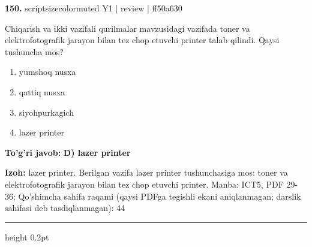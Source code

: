 \documentclass[10pt,a4paper]{article}
\begin{document}
{\bfseries\sffamily\color{ink} 150.} {scriptsizecolor{muted} Y1 | review | ff50a630}
\par
Chiqarish va ikki vazifali qurilmalar mavzusidagi vazifada toner va elektrofotografik jarayon bilan tez chop etuvchi printer talab qilindi. Qaysi tushuncha mos?
\begin{enumerate}[label=\Alph*),leftmargin=9mm]
\item yumshoq nusxa
\item qattiq nusxa
\item siyohpurkagich
\item lazer printer
\end{enumerate}
\begin{tcolorbox}[enhanced,breakable,colback=teal!4,colframe=teal!60!black,boxrule=0.45pt,arc=1.2mm,left=2.7mm,right=2.7mm,top=1.8mm,bottom=1.8mm,before skip=2mm,after skip=2mm]
{\bfseries\sffamily\color{teal}To'g'ri javob:} \textbf{D) lazer printer}
\par\smallskip
{\bfseries Izoh:} lazer printer. Berilgan vazifa lazer printer tushunchasiga mos: toner va elektrofotografik jarayon bilan tez chop etuvchi printer. Manba: ICT5, PDF 29-36; Qo'shimcha sahifa raqami (qaysi PDFga tegishli ekani aniqlanmagan; darslik sahifasi deb tasdiqlanmagan): 44
\end{tcolorbox}
\vspace{2mm}\hrule height 0.2pt\vspace{3mm}
\end{document}
